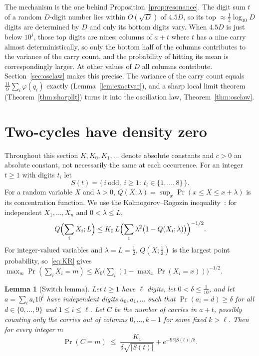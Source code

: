 \documentclass[11pt]{article}
\newtheorem{lemma}[theorem]{Lemma}
\theoremstyle{definition}
\theoremstyle{remark}
\begin{document}
The mechanism is the one behind Proposition~\ref{prop:resonance}. The digit
sum $t$ of a random $D$-digit number lies within $O(\sqrt D)$ of $4.5D$, so its
top $\approx\frac12\log_{10}D$ digits are determined by $D$ and only its bottom
digits vary. When $4.5D$ is just below $10^j$, those top digits are nines;
columns of $a+t$ where $t$ has a nine carry almost deterministically, so only
the bottom half of the columns contributes to the variance of the carry
count, and the probability of hitting its mean is correspondingly larger. At
other values of $D$ all columns contribute. Section~\ref{sec:osclaw} makes this precise. The variance of the carry
count equals $\frac{11}9\sum_i\varphi(q_i)$ exactly (Lemma~\ref{lem:exactvar}),
and a sharp local limit theorem (Theorem~\ref{thm:sharpllt}) turns it into the
oscillation law, Theorem~\ref{thm:osclaw}.

\section{Two-cycles have density zero}\label{sec:zero}

Throughout this section $K,K_0,K_1,\dots$ denote absolute constants and
$c>0$ an absolute constant, not necessarily the same at each occurrence. For
an integer $t\ge1$ with digits $t_i$ let
\[
  S(t)=\bigl\{\,i\ \text{odd},\ i\ge1:\ t_i\in\{1,\dots,8\}\,\bigr\}.
\]
For a random variable $X$ and $\lambda>0$, $Q(X;\lambda)=\sup_x
\Pr(x\le X\le x+\lambda)$ is its concentration function. We use the
Kolmogorov--Rogozin inequality~\cite{Rogozin,Petrov}: for independent
$X_1,\dots,X_n$ and $0<\lambda\le L$,
\begin{equation}\label{eq:KR}
  Q\Bigl(\sum_i X_i;L\Bigr)\le K_0\,L\Bigl(\sum_i\lambda^2\bigl(1-Q(X_i;\lambda)\bigr)\Bigr)^{-1/2}.
\end{equation}
For integer-valued variables and $\lambda=L=\tfrac12$, $Q(X;\tfrac12)$ is the
largest point probability, so~\eqref{eq:KR} gives
$\max_m\Pr(\sum_iX_i=m)\le K_0\bigl(\sum_i(1-\max_x\Pr(X_i=x))\bigr)^{-1/2}$.

\begin{lemma}[Switch lemma]\label{lem:switch}
Let $t\ge1$ have $\ell$ digits, let $0<\delta\le\tfrac1{10}$, and let
$a=\sum_i a_i10^i$ have independent digits $a_0,a_1,\dots$ such that
$\Pr(a_i=d)\ge\delta$ for all $d\in\{0,\dots,9\}$ and $1\le i\le\ell$. Let
$C$ be the number of carries in $a+t$, possibly counting only the carries out
of columns $0,\dots,k-1$ for some fixed $k>\ell$. Then for every integer $m$
\[
  \Pr(C=m)\;\le\;\frac{K_1}{\delta\sqrt{|S(t)|}}+e^{-9\delta|S(t)|/8}.
\]
\end{lemma}
\end{document}
